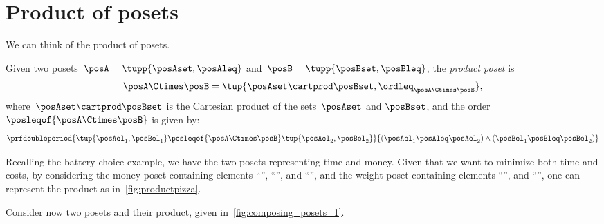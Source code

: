 
\section{Product of posets}
We can think of the product of posets.

\begin{definition}
    \label{def:productposet}
    Given two posets~$\posA=\tupp{\posAset, \posAleq}$ and~$\posB=\tupp{\posBset, \posBleq}$, the \emph{product poset} is
    \begin{equation}
        \posA\Ctimes \posB=\tup{\posAset \cartprod \posBset, \ordleq_{\posA\Ctimes \posB}},
    \end{equation}
    where~$\posAset \cartprod \posBset$ is the Cartesian product of the sets~$\posAset$ and $\posBset$, and the order~$\posleqof{\posA \Ctimes \posB}$ is given by:
    \begin{equation}
        \prfdoubleperiod{\tup{\posAel_1, \posBel_1}
            \posleqof{\posA\Ctimes \posB}
            \tup{\posAel_2, \posBel_2}}{(\posAel_1 \posAleq \posAel_2) \wedge
            (\posBel_1 \posBleq \posBel_2)}
    \end{equation}
\end{definition}
Recalling the battery choice example, we have the two posets representing time and money.
Given that we want to minimize both time and costs, by considering the money poset containing elements ``\poscheap'', ``\posmidrange'', and ``\posexpensive'', and the weight poset containing elements ``\poslight'', and ``\posheavy'', one can represent the product as in~\cref{fig:productpizza}.

\begin{figure*}[h!]
    \centering
    \caption{Product poset of time and weight for battery choices.}
    \label{fig:productpizza}
\end{figure*}

\begin{example}
    Consider now two posets and their product, given in~\cref{fig:composing_posets_1}.
    \begin{figure*}[h!]
        \caption{Product of two posets.}
        \label{fig:composing_posets_1}
    \end{figure*}
\end{example}
\vfill
\clearpage
